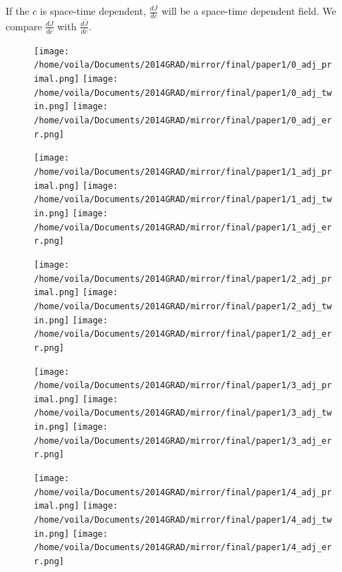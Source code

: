 \documentclass[a4paper,onecolumn]{article}
\theoremstyle{remark}
\begin{document}
\noindent If the $c$ is space-time dependent, $\frac{dJ}{dc}$ will be a space-time dependent field.
We compare $\frac{dJ}{dc}$ with $\frac{d\tilde{J}}{dc}$.
\begin{figure}[H]\begin{center}
    \texttt{[image: /home/voila/Documents/2014GRAD/mirror/final/paper1/0\_adj\_primal.png]}
    \texttt{[image: /home/voila/Documents/2014GRAD/mirror/final/paper1/0\_adj\_twin.png]}
    \texttt{[image: /home/voila/Documents/2014GRAD/mirror/final/paper1/0\_adj\_err.png]}
    \label{fig:sol compare}
\end{center}\end{figure}
\vspace{-1cm}
\begin{figure}[H]\begin{center}
    \texttt{[image: /home/voila/Documents/2014GRAD/mirror/final/paper1/1\_adj\_primal.png]}
    \texttt{[image: /home/voila/Documents/2014GRAD/mirror/final/paper1/1\_adj\_twin.png]}
    \texttt{[image: /home/voila/Documents/2014GRAD/mirror/final/paper1/1\_adj\_err.png]}
    \label{fig:sol compare}
\end{center}\end{figure}
\vspace{-1cm}
\begin{figure}[H]\begin{center}
    \texttt{[image: /home/voila/Documents/2014GRAD/mirror/final/paper1/2\_adj\_primal.png]}
    \texttt{[image: /home/voila/Documents/2014GRAD/mirror/final/paper1/2\_adj\_twin.png]}
    \texttt{[image: /home/voila/Documents/2014GRAD/mirror/final/paper1/2\_adj\_err.png]}
    \label{fig:sol compare}
\end{center}\end{figure}
\vspace{-1cm}
\begin{figure}[H]\begin{center}
    \texttt{[image: /home/voila/Documents/2014GRAD/mirror/final/paper1/3\_adj\_primal.png]}
    \texttt{[image: /home/voila/Documents/2014GRAD/mirror/final/paper1/3\_adj\_twin.png]}
    \texttt{[image: /home/voila/Documents/2014GRAD/mirror/final/paper1/3\_adj\_err.png]}
    \label{fig:sol compare}
\end{center}\end{figure}
\vspace{-1cm}
\begin{figure}[H]\begin{center}
    \texttt{[image: /home/voila/Documents/2014GRAD/mirror/final/paper1/4\_adj\_primal.png]}
    \texttt{[image: /home/voila/Documents/2014GRAD/mirror/final/paper1/4\_adj\_twin.png]}
    \texttt{[image: /home/voila/Documents/2014GRAD/mirror/final/paper1/4\_adj\_err.png]}
    \label{fig:sol compare}
\end{center}\end{figure}
\end{document}
